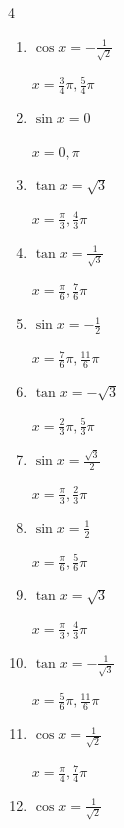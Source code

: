 \begin{multicols}{4}
\begin{enumerate}
  \item $\displaystyle \cos{x}  = -\frac{1}{\sqrt{2}}$

        $\displaystyle x = \frac{3}{4}\pi , \frac{5}{4}\pi$

  \item $\displaystyle \sin{x}  = 0$

        $\displaystyle x = 0 , \pi$

  \item $\displaystyle \tan{x}  = \sqrt{3}$

        $\displaystyle x = \frac{\pi}{3} , \frac{4}{3}\pi$

  \item $\displaystyle \tan{x}  = \frac{1}{\sqrt{3}}$

        $\displaystyle x = \frac{\pi}{6} , \frac{7}{6}\pi$

  \item $\displaystyle \sin{x}  = -\frac{1}{2}$

        $\displaystyle x = \frac{7}{6}\pi , \frac{11}{6}\pi$

\columnbreak %

  \item $\displaystyle \tan{x}  = -\sqrt{3}$

        $\displaystyle x = \frac{2}{3}\pi , \frac{5}{3}\pi$

  \item $\displaystyle \sin{x}  = \frac{\sqrt{3}}{2}$

        $\displaystyle x = \frac{\pi}{3} , \frac{2}{3}\pi$

  \item $\displaystyle \sin{x}  = \frac{1}{2}$

        $\displaystyle x = \frac{\pi}{6} , \frac{5}{6}\pi$

  \item $\displaystyle \tan{x}  = \sqrt{3}$

        $\displaystyle x = \frac{\pi}{3} , \frac{4}{3}\pi$

  \item $\displaystyle \tan{x}  = -\frac{1}{\sqrt{3}}$

        $\displaystyle x = \frac{5}{6}\pi , \frac{11}{6}\pi$

  \item $\displaystyle \cos{x}  = \frac{1}{\sqrt{2}}$

        $\displaystyle x = \frac{\pi}{4} , \frac{7}{4}\pi$

  \item $\displaystyle \cos{x}  = \frac{1}{\sqrt{2}}$


\end{enumerate}
\end{multicols}
